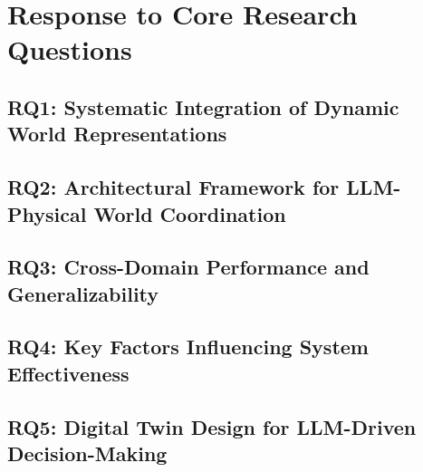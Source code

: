 \section{Response to Core Research Questions}

\subsection{RQ1: Systematic Integration of Dynamic World Representations}

\subsection{RQ2: Architectural Framework for LLM-Physical World Coordination}

\subsection{RQ3: Cross-Domain Performance and Generalizability}

\subsection{RQ4: Key Factors Influencing System Effectiveness}

\subsection{RQ5: Digital Twin Design for LLM-Driven Decision-Making}

